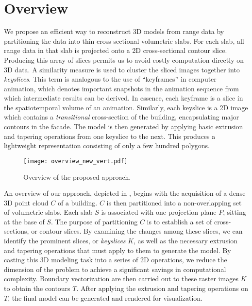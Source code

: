 
\section{Overview}

We propose an efficient way to reconstruct 3D models from range data by
partitioning the data into thin cross-sectional volumetric slabs.
For each slab, all range data in that slab is projected onto a 2D
cross-sectional contour slice.
Producing this array of slices permits us to avoid costly computation directly
on 3D data.
A similarity measure is used to
cluster the sliced images together into {\it keyslices}.
This term is analogous to the use of ``keyframes'' in computer animation,
which denotes important snapshots in the animation sequence from which
intermediate results can be derived.
In essence, each keyframe is a slice in the spatiotemporal volume of
an animation.
Similarly, each keyslice is a 2D image which contains a {\it transitional}
cross-section of the building, encapsulating major contours in the facade.
The model is then generated by applying basic extrusion and tapering
operations from one keyslice to the next.
This produces a lightweight representation consisting of only a few
hundred polygons.

\begin{figure}[htbp]
\begin{center}
\texttt{[image: overview\_new\_vert.pdf]}
\end{center}
\caption{Overview of the proposed approach.}
\label{fig:ov}
\end{figure}

An overview of our approach, depicted in , begins with the
acquisition of a dense 3D point cloud $C$ of a building.
$C$ is then partitioned into a non-overlapping set of volumetric slabs.
Each slab $S$ is associated with one projection plane $P$,
sitting at the base of $S$.
The purpose of partitioning $C$ is to establish a set of cross-sections,
or contour slices.
By examining the changes among these slices, we can identify the prominent
slices, or {\it keyslices} $K$, as well as the necessary extrusion and
tapering operations that must apply to them to generate the model.
By casting this 3D modeling task into a series of 2D operations, we
reduce the dimension of the problem to achieve a significant savings in
computational complexity.
Boundary vectorization are then carried out to these raster images $K$
to obtain the contours $T$.
After applying the extrusion and tapering operations on $T$,
the final model can be generated and rendered for visualization.

